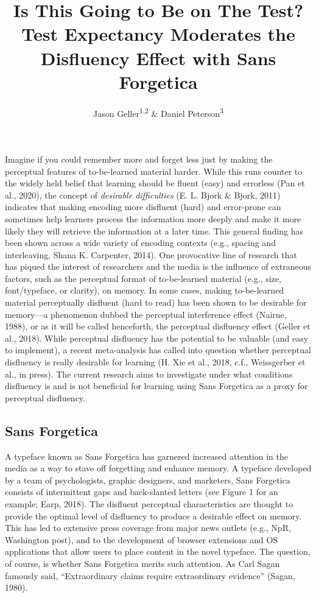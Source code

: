 \documentclass[
  english,
  jou]{apa7}
\title{Is This Going to Be on The Test? Test Expectancy Moderates the Disfluency Effect with Sans Forgetica}
\author{Jason Geller\textsuperscript{1,2} \& Daniel Peterson\textsuperscript{3}}
\date{}
\affiliation{\vspace{0.5cm}\textsuperscript{1} University of Iowa\\\textsuperscript{2} Rutgers University Center for Cognitive Science\\\textsuperscript{3} Skidmore College}
\begin{document}
\maketitle

Imagine if you could remember more and forget less just by making the perceptual features of to-be-learned material harder. While this runs counter to the widely held belief that learning should be fluent (easy) and errorless (Pan et al., 2020), the concept of \emph{desirable difficulties} (E. L. Bjork \& Bjork, 2011) indicates that making encoding more disfluent (hard) and error-prone can sometimes help learners process the information more deeply and make it more likely they will retrieve the information at a later time. This general finding has been shown across a wide variety of encoding contexts (e.g., spacing and interleaving, Shana K. Carpenter, 2014). One provocative line of research that has piqued the interest of researchers and the media is the influence of extraneous factors, such as the perceptual format of to-be-learned material (e.g., size, font/typeface, or clarity), on memory. In some cases, making to-be-learned material perceptually disfluent (hard to read) has been shown to be desirable for memory---a phenomenon dubbed the perceptual interference effect (Nairne, 1988), or as it will be called henceforth, the perceptual disfluency effect (Geller et al., 2018). While perceptual disfluency has the potential to be valuable (and easy to implement), a recent meta-analysis has called into question whether perceptual disfluency is really desirable for learning (H. Xie et al., 2018, c.f., Weissgerber et al., in press). The current research aims to investigate under what conditions disfluency is and is not beneficial for learning using Sans Forgetica as a proxy for perceptual disfluency.

\hypertarget{sans-forgetica}{%
\subsection{Sans Forgetica}\label{sans-forgetica}}

A typeface known as Sans Forgetica has garnered increased attention in the media as a way to stave off forgetting and enhance memory. A typeface developed by a team of psychologists, graphic designers, and marketers, Sans Forgetica consists of intermittent gaps and back-slanted letters (see Figure 1 for an example; Earp, 2018). The disfluent perceptual characteristics are thought to provide the optimal level of disfluency to produce a desirable effect on memory. This has led to extensive press coverage from major news outlets (e.g., NpR, Washington post), and to the development of browser extensions and OS applications that allow users to place content in the novel typeface. The question, of course, is whether Sans Forgetica merits such attention. As Carl Sagan famously said, ``Extraordinary claims require extraordinary evidence'' (Sagan, 1980).
\end{document}
